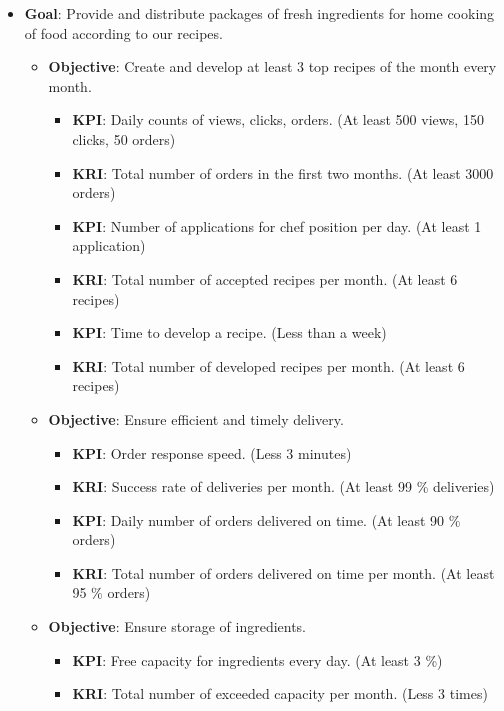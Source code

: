 \documentclass[11pt,a4paper]{article}
\begin{document}
\begin{itemize}
    \item \textbf{Goal}: Provide and distribute packages of fresh ingredients for home cooking of food according to our recipes.
    \begin{itemize}
        \item \textbf{Objective}: Create and develop at least 3 top recipes of the month every month.
        \begin{itemize}
            \item \textbf{KPI}: Daily counts of views, clicks, orders. (At least 500 views, 150 clicks, 50 orders)
            \item \textbf{KRI}: Total number of orders in the first two months. (At least 3000 orders)
            \item \textbf{KPI}: Number of applications for chef position per day. (At least 1 application)
            \item \textbf{KRI}: Total number of accepted recipes per month. (At least 6 recipes)
            \item \textbf{KPI}: Time to develop a recipe. (Less than a week)
            \item \textbf{KRI}: Total number of developed recipes per month. (At least 6 recipes)
        \end{itemize}
        \item \textbf{Objective}: Ensure efficient and timely delivery.
        \begin{itemize}
            \item \textbf{KPI}: Order response speed. (Less 3 minutes)
            \item \textbf{KRI}: Success rate of deliveries per month. (At least 99 \% deliveries)
            \item \textbf{KPI}: Daily number of orders delivered on time. (At least 90 \% orders)
            \item \textbf{KRI}: Total number of orders delivered on time per month. (At least 95 \% orders)
        \end{itemize}
        \item \textbf{Objective}: Ensure storage of ingredients.
        \begin{itemize}
            \item \textbf{KPI}: Free capacity for ingredients every day. (At least 3 \%)
            \item \textbf{KRI}: Total number of exceeded capacity per month. (Less 3 times)
        \end{itemize}

\end{itemize}
\end{itemize}
\end{document}
